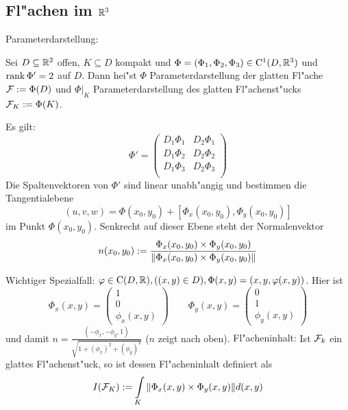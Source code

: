 \subsection{Fl"achen im $\SetR^3$}
 Parameterdarstellung:{
  Sei $D\subseteq\SetR^2$ offen, $K\subseteq D$ kompakt und $\Phi=(\Phi_1,\Phi_2,
  \Phi_3)\in\SetCont^1(D,\SetR^3)$ und $\rank\Phi'=2$ auf $D$. Dann 
  hei"st $\Phi$ Parameterdarstellung der glatten Fl"ache 
  $\cal F:=\Phi(D)$ und $\Phi|_K$ Parameterdarstellung des glatten 
  Fl"achenst"ucks $\cal F_K:=\Phi(K)$.

  Es gilt:
  \[\Phi'=\begin{pmatrix}
             D_1\Phi_1 & D_2\Phi_1 \\
             D_1\Phi_2 & D_2\Phi_2 \\
             D_1\Phi_3 & D_2\Phi_3 \\
	     \end{pmatrix}
    \]
  Die Spaltenvektoren von $\Phi'$ sind linear unabh"angig und bestimmen die 
  Tangentialebene
  \[
    (u,v,w)=\Phi(x_0,y_0)+[\Phi_x(x_0,y_0),\Phi_y(x_0,y_0)]
    \]
  im Punkt $\Phi(x_0,y_0)$. Senkrecht auf dieser Ebene steht der Normalenvektor
  \[
    n(x_0,y_0):=\frac{\Phi_x(x_0,y_0)\times\Phi_y(x_0,y_0)}{\norm{\Phi_x(x_0,y_0)
    \times\Phi_y(x_0,y_0)}}
    \]
  }
\remark Wichtiger Spezialfall:{
  $\phi\in\SetCont(D,\SetR),((x,y)\in D),\Phi(x,y)=(x,y,\phi(x,y))$.
  Hier ist
  \[\Phi_x(x,y)=\begin{pmatrix}1 \\ 0 \\ \phi_x(x,y)\end{pmatrix} \qquad
    \Phi_y(x,y)=\begin{pmatrix}0 \\ 1 \\ \phi_y(x,y)\end{pmatrix}
    \]
  und damit $n=\frac{(-\phi_x,-\phi_y,1)}{\sqrt{1+(\phi_x)^2+(\phi_y)^2}}$ 
  ($n$ zeigt nach oben).
  }
 Fl"acheninhalt:{
  Ist $\cal F_k$ ein glattes Fl"achenst"uck, so ist dessen Fl"acheninhalt 
  definiert als
  \[I(\cal F_K):=\int_K\norm{\Phi_x(x,y)\times\Phi_y(x,y)}d(x,y)
    \]
  }
